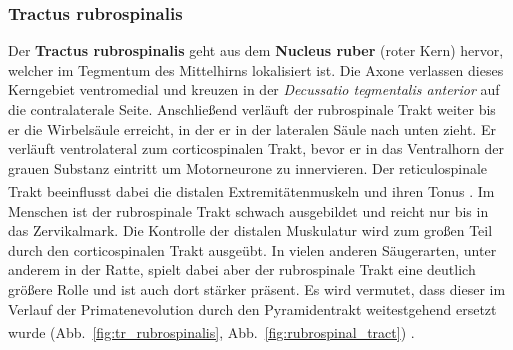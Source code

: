 \documentclass[12pt,a4paper,pdftex]{article}
\begin{document}
\subsubsection{Tractus rubrospinalis}  \label{subsubsec:rubrospinalis}
Der \textbf{Tractus rubrospinalis} geht aus dem \textbf{Nucleus ruber} (roter Kern) hervor, welcher im Tegmentum des Mittelhirns lokalisiert ist. Die Axone verlassen dieses Kerngebiet ventromedial und kreuzen in der \textit{Decussatio tegmentalis anterior} auf die contralaterale Seite. Anschließend verläuft der rubrospinale Trakt weiter bis er die Wirbelsäule erreicht, in der er in der lateralen Säule nach unten zieht. Er verläuft ventrolateral zum corticospinalen Trakt, bevor er in das Ventralhorn der grauen Substanz eintritt um Motorneurone zu innervieren. Der reticulospinale Trakt beeinflusst dabei die distalen Extremitätenmuskeln und ihren Tonus \textsuperscript{\cite[8]{crossman2014neuroanatomy}}. Im Menschen ist der rubrospinale Trakt schwach ausgebildet und reicht nur bis in das Zervikalmark. Die Kontrolle der distalen Muskulatur wird zum großen Teil durch den corticospinalen Trakt ausgeübt. In vielen anderen Säugerarten, unter anderem in der Ratte, spielt dabei aber der rubrospinale Trakt eine deutlich größere Rolle und ist auch dort stärker präsent. Es wird vermutet, dass dieser im Verlauf der Primatenevolution durch den Pyramidentrakt weitestgehend ersetzt wurde (Abb.~\ref{fig:tr_rubrospinalis}, Abb.~\ref{fig:rubrospinal_tract}) \textsuperscript{\cite[14]{neurowissenschaften_baer}}. 
\end{document}
